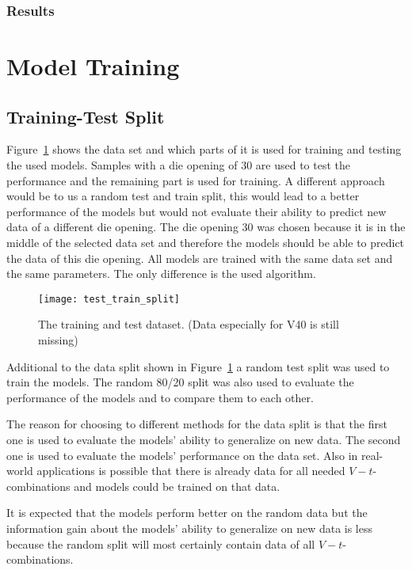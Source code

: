 \subsubsection*{Results}

\label{sec:model-training}


\section{Model Training}

\subsection{Training-Test Split}
Figure~\ref{fig:train_test_split} shows the data set and which parts of it is used for training and testing the used
models. Samples with a die opening of 30 are used to test the performance and the remaining part is used for training.
A different approach would be to us a random test and train split, this would lead to a better performance of the
models but would not evaluate their ability to predict new data of a different die opening.
The die opening 30 was chosen because it is in the middle of the selected data set and therefore the models should be
able to predict the data of this die opening.
All models are trained with the same data set and the same parameters. The only difference is the used algorithm.


\begin{figure}[H]
    \centering
    \texttt{[image: test\_train\_split]}
    \caption{The training and test dataset. (Data especially for V40 is still missing)}
    \label{fig:train_test_split}
\end{figure}

Additional to the data split shown in Figure~\ref{fig:train_test_split} a random test split was used to train the
models. The random 80/20 split was also used to evaluate the performance of the models and to compare them to each
other.

The reason for choosing to different methods for the data split is that the first one is used to evaluate the models'
ability to generalize on new data. The second one is used to evaluate the models' performance on the data set.
Also in real-world applications is possible that there is already data for all needed $V-t$-combinations and models
could be trained on that data.

It is expected that the models perform better on the random data but the information gain about the models' ability
to generalize on new data is less because the random split will most certainly contain data of all $V-t$-combinations.


